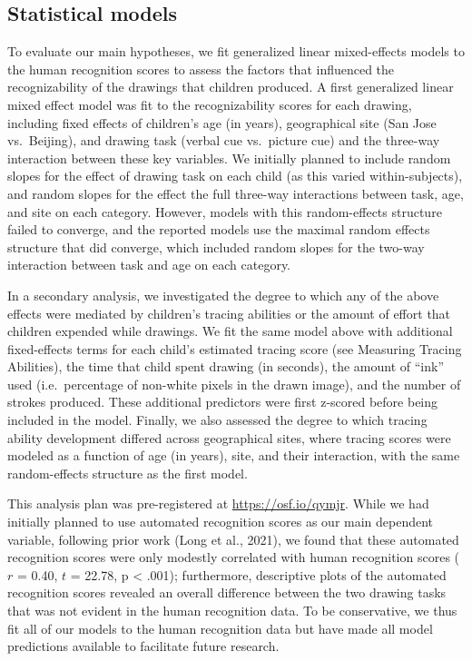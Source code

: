 \documentclass[
  english,
  man]{apa6}
\begin{document}
\hypertarget{statistical-models}{%
\subsection{Statistical models}\label{statistical-models}}

To evaluate our main hypotheses, we fit generalized linear mixed-effects models to the human recognition scores to assess the factors that influenced the recognizability of the drawings that children produced. A first generalized linear mixed effect model was fit to the recognizability scores for each drawing, including fixed effects of children's age (in years), geographical site (San Jose vs.~Beijing), and drawing task (verbal cue vs.~picture cue) and the three-way interaction between these key variables. We initially planned to include random slopes for the effect of drawing task on each child (as this varied within-subjects), and random slopes for the effect the full three-way interactions between task, age, and site on each category. However, models with this random-effects structure failed to converge, and the reported models use the maximal random effects structure that did converge, which included random slopes for the two-way interaction between task and age on each category.

In a secondary analysis, we investigated the degree to which any of the above effects were mediated by children's tracing abilities or the amount of effort that children expended while drawings.
We fit the same model above with additional fixed-effects terms for each child's estimated tracing score (see Measuring Tracing Abilities), the time that child spent drawing (in seconds), the amount of \enquote{ink} used (i.e.~percentage of non-white pixels in the drawn image), and the number of strokes produced.
These additional predictors were first z-scored before being included in the model.
Finally, we also assessed the degree to which tracing ability development differed across geographical sites, where tracing scores were modeled as a function of age (in years), site, and their interaction, with the same random-effects structure as the first model.

This analysis plan was pre-registered at \url{https://osf.io/qymjr}. While we had initially planned to use automated recognition scores as our main dependent variable, following prior work (Long et al., 2021), we found that these automated recognition scores were only modestly correlated with human recognition scores (\(r\) = 0.40, \(t\) = 22.78, p \textless{} .001); furthermore, descriptive plots of the automated recognition scores revealed an overall difference between the two drawing tasks that was not evident in the human recognition data. To be conservative, we thus fit all of our models to the human recognition data but have made all model predictions available to facilitate future research.
\end{document}
